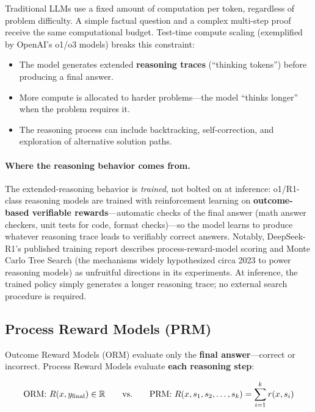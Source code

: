 Traditional LLMs use a fixed amount of computation per token, regardless of
problem difficulty.  A simple factual question and a complex multi-step proof
receive the same computational budget.  Test-time compute scaling (exemplified
by OpenAI's o1/o3 models) breaks this constraint:

\begin{itemize}[leftmargin=*]
\item The model generates extended \textbf{reasoning traces} (``thinking
  tokens'') before producing a final answer.
\item More compute is allocated to harder problems---the model ``thinks
  longer'' when the problem requires it.
\item The reasoning process can include backtracking, self-correction, and
  exploration of alternative solution paths.
\end{itemize}

\paragraph{Where the reasoning behavior comes from.}
The extended-reasoning behavior is \emph{trained}, not bolted on at
inference: o1/R1-class reasoning models are trained with reinforcement
learning on \textbf{outcome-based verifiable rewards}---automatic checks of
the final answer (math answer checkers, unit tests for code, format
checks)---so the model learns to produce whatever reasoning trace leads to
verifiably correct answers.  Notably, DeepSeek-R1's published training
report describes process-reward-model scoring and Monte Carlo Tree Search
(the mechanisms widely hypothesized circa 2023 to power reasoning models)
as unfruitful directions in its experiments.  At inference, the trained
policy simply generates a longer reasoning trace; no external search
procedure is required.

\subsection{Process Reward Models (PRM)}

Outcome Reward Models (ORM) evaluate only the \textbf{final answer}---correct
or incorrect.  Process Reward Models evaluate \textbf{each reasoning step}:

\begin{equation}
\text{ORM: } R(x, y_{\text{final}}) \in \mathbb{R}
\qquad\text{vs.}\qquad
\text{PRM: } R(x, s_1, s_2, \ldots, s_k) = \sum_{i=1}^{k} r(x, s_i)
\label{eq:prm}
\end{equation}

